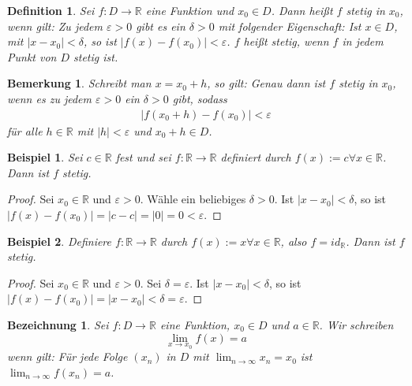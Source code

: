 \documentclass[a4paper,10pt]{article}
\newtheorem{definition}{Definition}
\newtheorem{notice}{Bemerkung}
\newtheorem{example}{Beispiel}
\newtheorem{bezeichnung}{Bezeichnung}
\begin{document}
\begin{definition}
 Sei $f: D \rightarrow \mathbb{R}$ eine Funktion und $x_0 \in D$.
 Dann heißt $f$ stetig in $x_0$, wenn gilt:
 Zu jedem $\varepsilon > 0$ gibt es ein $\delta > 0$ mit folgender Eigenschaft:
 Ist $x \in D$, mit $|x - x_0| < \delta$, so ist $|f(x) - f(x_0)| < \varepsilon$.
 $f$ heißt stetig, wenn $f$ in jedem Punkt von $D$ stetig ist.
\end{definition}

\begin{notice}
 Schreibt man $x = x_0 + h$, so gilt: Genau dann ist $f$ stetig in $x_0$, wenn es zu jedem $\varepsilon > 0$ ein $\delta > 0$ gibt, sodass
 \begin{align}
  |f(x_0 + h) - f(x_0)| < \varepsilon
 \end{align}
 für alle $h \in \mathbb{R}$ mit $|h| < \varepsilon$ und $x_0 + h \in D$.
\end{notice}

\begin{example}
 Sei $c \in \mathbb{R}$ fest und sei $f: \mathbb{R} \rightarrow \mathbb{R}$ definiert durch $f(x) := c \forall x \in \mathbb{R}$.
 Dann ist $f$ stetig.
\end{example}

\begin{proof}
 Sei $x_0 \in \mathbb{R}$ und $\varepsilon > 0$.
 Wähle ein beliebiges $\delta > 0$.
 Ist $|x - x_0| < \delta$, so ist $|f(x) - f(x_0)| = |c - c| = |0| = 0 < \varepsilon$.
\end{proof}

\begin{example}
 Definiere $f: \mathbb{R} \rightarrow \mathbb{R}$ durch $f(x) := x \forall x \in \mathbb{R}$, also $f = id_\mathbb{R}$.
 Dann ist $f$ stetig.
\end{example}

\begin{proof}
 Sei $x_0 \in \mathbb{R}$ und $\varepsilon > 0$.
 Sei $\delta = \varepsilon$.
 Ist $|x - x_0| < \delta$, so ist $|f(x) - f(x_0)| = |x - x_0| < \delta = \varepsilon$.
\end{proof}

\begin{bezeichnung}
 Sei $f: D \rightarrow \mathbb{R}$ eine Funktion, $x_0 \in D$ und $a \in \mathbb{R}$.
 Wir schreiben
 \begin{equation}
  \lim_{x \rightarrow x_0} f(x) = a
 \end{equation}
 wenn gilt: Für jede Folge $(x_n)$ in $D$ mit $\lim_{n \rightarrow \infty} x_n = x_0$ ist $\lim_{n \rightarrow \infty} f(x_n) = a$.
\end{bezeichnung}
\end{document}
